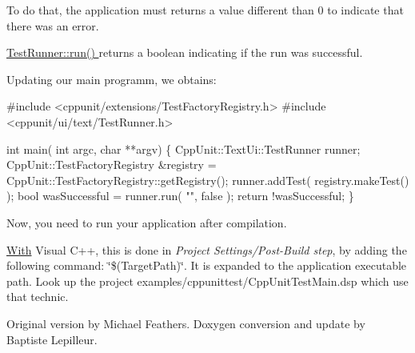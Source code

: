 To do that, the application must returns a value different than 0 to indicate that there was an error.

\hyperlink{}{Test\+Runner\+::run() } returns a boolean indicating if the run was successful.

Updating our main programm, we obtains\+: 
\begin{DoxyCode}
\textcolor{preprocessor}{#include <cppunit/extensions/TestFactoryRegistry.h>}
\textcolor{preprocessor}{#include <cppunit/ui/text/TestRunner.h>}

\textcolor{keywordtype}{int} main( \textcolor{keywordtype}{int} argc, \textcolor{keywordtype}{char} **argv)
\{
  CppUnit::TextUi::TestRunner runner;
  CppUnit::TestFactoryRegistry &registry = CppUnit::TestFactoryRegistry::getRegistry();
  runner.addTest( registry.makeTest() );
  \textcolor{keywordtype}{bool} wasSuccessful = runner.run( \textcolor{stringliteral}{""}, \textcolor{keyword}{false} );
  \textcolor{keywordflow}{return} !wasSuccessful;
\}
\end{DoxyCode}


Now, you need to run your application after compilation.

\hyperlink{struct_with}{With} Visual C++, this is done in {\itshape Project Settings/\+Post-\/\+Build step}, by adding the following command\+: {\ttfamily \char`\"{}\$(\+Target\+Path)\char`\"{}}. It is expanded to the application executable path. Look up the project {\ttfamily examples/cppunittest/\+Cpp\+Unit\+Test\+Main.\+dsp} which use that technic.

Original version by Michael Feathers. Doxygen conversion and update by Baptiste Lepilleur. 